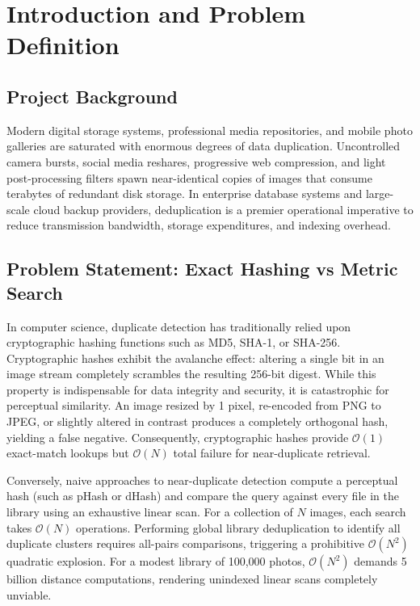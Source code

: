 \documentclass[11pt,a4paper]{article}
\begin{document}
\clearpage
\tableofcontents
\clearpage

\section{Introduction and Problem Definition}
\subsection{Project Background}
Modern digital storage systems, professional media repositories, and mobile photo galleries are saturated with enormous degrees of data duplication. Uncontrolled camera bursts, social media reshares, progressive web compression, and light post-processing filters spawn near-identical copies of images that consume terabytes of redundant disk storage. In enterprise database systems and large-scale cloud backup providers, deduplication is a premier operational imperative to reduce transmission bandwidth, storage expenditures, and indexing overhead.

\subsection{Problem Statement: Exact Hashing vs Metric Search}
In computer science, duplicate detection has traditionally relied upon cryptographic hashing functions such as MD5, SHA-1, or SHA-256. Cryptographic hashes exhibit the avalanche effect: altering a single bit in an image stream completely scrambles the resulting 256-bit digest. While this property is indispensable for data integrity and security, it is catastrophic for perceptual similarity. An image resized by 1 pixel, re-encoded from PNG to JPEG, or slightly altered in contrast produces a completely orthogonal hash, yielding a false negative. Consequently, cryptographic hashes provide $\mathcal{O}(1)$ exact-match lookups but $\mathcal{O}(N)$ total failure for near-duplicate retrieval.

Conversely, naive approaches to near-duplicate detection compute a perceptual hash (such as pHash or dHash) and compare the query against every file in the library using an exhaustive linear scan. For a collection of $N$ images, each search takes $\mathcal{O}(N)$ operations. Performing global library deduplication to identify all duplicate clusters requires all-pairs comparisons, triggering a prohibitive $\mathcal{O}(N^2)$ quadratic explosion. For a modest library of 100,000 photos, $\mathcal{O}(N^2)$ demands 5 billion distance computations, rendering unindexed linear scans completely unviable.
\end{document}
